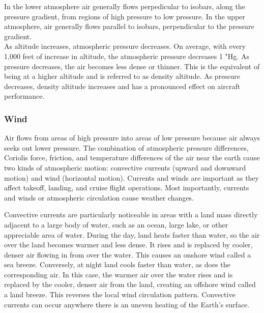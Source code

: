 \documentclass[12pt]{article}
\begin{document}
			In the lower atmosphere air generally flows perpedicular to isobars, along the pressure gradient, from regions of high pressure to low pressure. In the upper atmosphere, air generally flows parallel to isobars, perpendicular to the pressure gradient.\\

			As altitude increases, atmospheric pressure decreases. On average, with every 1,000 feet of increase in altitude, the atmospheric pressure decreases 1 "Hg. As pressure decreases, the air becomes less dense or thinner. This is the equivalent of being at a higher altitude and is referred to as density altitude. As pressure decreases, density altitude increases and has a pronounced effect on aircraft performance.

		\subsubsection{Wind}
			Air flows from areas of high pressure into areas of low pressure because air always seeks out lower pressure. The combination of atmospheric pressure differences, Coriolis force, friction, and temperature differences of the air near the earth cause two kinds of atmospheric motion: convective currents (upward and downward motion) and wind (horizontal motion). Currents and winds are important as they affect takeoff, landing, and cruise flight operations. Most importantly, currents and winds or atmospheric circulation cause weather changes.

			Convective currents are particularly noticeable in areas with a land mass directly adjacent to a large body of water, such as an ocean, large lake, or other appreciable area of water. During the day, land heats faster than water, so the air over the land becomes warmer and less dense. It rises and is replaced by cooler, denser air flowing in from over the water. This causes an onshore wind called a sea breeze. Conversely, at night land cools faster than water, as does the corresponding air. In this case, the warmer air over the water rises and is replaced by the cooler, denser air from the land, creating an offshore wind called a land breeze. This reverses the local wind circulation pattern. Convective currents can occur anywhere there is an uneven heating of the Earth’s surface. 
\end{document}
